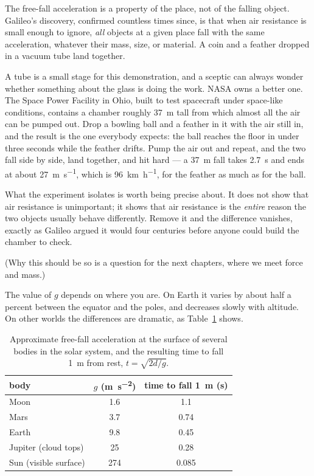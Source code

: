 \documentclass[11pt,twoside,openany]{book}
\newcounter{check}[chapter]
\begin{document}
The free-fall acceleration is a property of the place, not of the falling object. Galileo's discovery, confirmed countless times since, is that when air resistance is small enough to ignore, \emph{all} objects at a given place fall with the same acceleration, whatever their mass, size, or material. A coin and a feather dropped in a vacuum tube land together.

\begin{modelnote}
A tube is a small stage for this demonstration, and a sceptic can always wonder whether something about the glass is doing the work. NASA owns a better one. The Space Power Facility in Ohio, built to test spacecraft under space-like conditions, contains a chamber roughly \SI{37}{\metre} tall from which almost all the air can be pumped out. Drop a bowling ball and a feather in it with the air still in, and the result is the one everybody expects: the ball reaches the floor in under three seconds while the feather drifts. Pump the air out and repeat, and the two fall side by side, land together, and hit hard --- a \SI{37}{\metre} fall takes \SI{2.7}{\second} and ends at about \SI{27}{\metre\per\second}, which is \SI{96}{\kilo\metre\per\hour}, for the feather as much as for the ball.

What the experiment isolates is worth being precise about. It does not show that air resistance is unimportant; it shows that air resistance is the \emph{entire} reason the two objects usually behave differently. Remove it and the difference vanishes, exactly as Galileo argued it would four centuries before anyone could build the chamber to check.
\end{modelnote} (Why this should be so is a question for the next chapters, where we meet force and mass.)

The value of $g$ depends on where you are. On Earth it varies by about half a percent between the equator and the poles, and decreases slowly with altitude. On other worlds the differences are dramatic, as Table~\ref{tab:gvalues} shows.

\begin{table}[htb]
\centering
\caption{Approximate free-fall acceleration at the surface of several bodies in the solar system, and the resulting time to fall \SI{1}{\metre} from rest, $t = \sqrt{2d/g}$.}
\label{tab:gvalues}
\renewcommand{\arraystretch}{1.2}
\begin{tabular}{lcc}
\toprule
body & $g$ (\si{\metre\per\second\squared}) & time to fall \SI{1}{\metre} (s) \\
\midrule
Moon    & 1.6  & 1.1 \\
Mars    & 3.7  & 0.74 \\
Earth   & 9.8  & 0.45 \\
Jupiter (cloud tops) & 25 & 0.28 \\
Sun (visible surface) & 274 & 0.085 \\
\bottomrule
\end{tabular}
\end{table}
\end{document}

